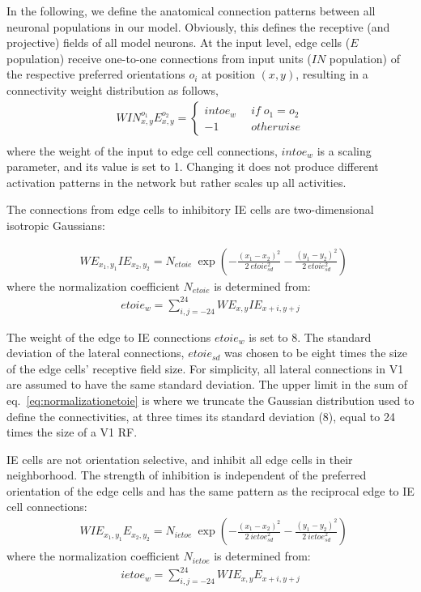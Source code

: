 In the following, we define the anatomical connection patterns between
all neuronal populations in our model. Obviously, this defines the
receptive (and projective) fields of all model neurons. At the input
level, edge cells ($E$ population)  receive 
one-to-one
connections from input units
($IN$ population) of the respective preferred
orientations $o_i$ at 
position $(x,y)$,
resulting in
a connectivity weight distribution as follows,
\begin{align}
	WIN^{o_1}_{x,y}E^{o_2}_{x,y}=
	\begin{cases}
	intoe_w \:\;&if\;o_1 = o_2\\\nonumber
	-1\;&otherwise
	\end{cases}\\
\end{align}
where the weight of the input to edge cell connections, $intoe_w$ is a
scaling parameter, and its value is set to 1.  Changing it does not
produce different activation patterns in the network but rather scales
up all activities.

The connections from edge cells 
to inhibitory IE cells are two-dimensional isotropic Gaussians: 

\begin{align}
	&WE_{x_1,y_1}IE_{x_2,y_2}=N_{etoie}\: \exp\left(-\frac{(x_1-x_2)^2}{2\: etoie_{sd}^2}-\frac{(y_1-y_2)^2}{2\: etoie_{sd}^2}\right)\
\end{align}
where the normalization coefficient $N_{etoie}$ is determined from:
\begin{align}
	etoie_w = \sum^{24}_{i,j=-24} WE_{x,y}IE_{x+i,y+j}
\label{eq:normalizationetoie}
\end{align}

The weight of the edge to IE connections $etoie_w$ is set to 8. The standard deviation of the lateral connections,
$etoie_{sd}$ was chosen to be eight times the size of the edge cells'
receptive field size. For simplicity, all lateral connections in V1
are assumed to have the same standard deviation.
The upper limit in the sum of eq.~\ref{eq:normalizationetoie} is where
we truncate the Gaussian distribution used to define the
connectivities, at three times its standard deviation (8), equal to 24
times the size of a V1 RF.

IE cells are not orientation selective, and inhibit all edge cells in
their neighborhood. The strength of inhibition is independent of
the preferred orientation of the edge cells and has the same
pattern as the reciprocal edge to IE cell connections: 
\begin{align}
	&WIE_{x_1,y_1}E_{x_2,y_2}=N_{ietoe}\: \exp\left(-\frac{(x_1-x_2)^2}{2\: ietoe_{sd}^2}-\frac{(y_1-y_2)^2}{2\: ietoe_{sd}^2}\right)\
\end{align}
where the normalization coefficient $N_{ietoe}$ is determined from:
\begin{align}
	ietoe_w = \sum^{24}_{i,j=-24} WIE_{x,y}E_{x+i,y+j}
\end{align}

